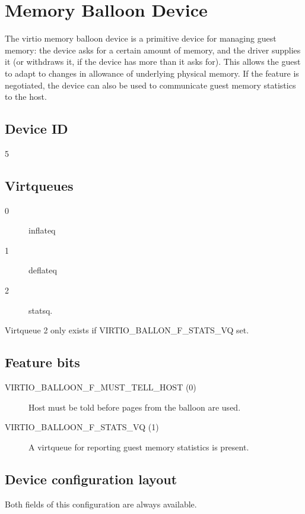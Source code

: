 \section{Memory Balloon Device}\label{sec:Device Types / Memory Balloon Device}

The virtio memory balloon device is a primitive device for
managing guest memory: the device asks for a certain amount of
memory, and the driver supplies it (or withdraws it, if the device
has more than it asks for). This allows the guest to adapt to
changes in allowance of underlying physical memory. If the
feature is negotiated, the device can also be used to communicate
guest memory statistics to the host.

\subsection{Device ID}\label{sec:Device Types / Memory Balloon Device / Device ID}
  5

\subsection{Virtqueues}\label{sec:Device Types / Memory Balloon Device / Virtqueues}
\begin{description}
\item[0] inflateq
\item[1] deflateq
\item[2] statsq.
\end{description}

  Virtqueue 2 only exists if VIRTIO_BALLON_F_STATS_VQ set.

\subsection{Feature bits}\label{sec:Device Types / Memory Balloon Device / Feature bits}
\begin{description}
\item[VIRTIO_BALLOON_F_MUST_TELL_HOST (0)] Host must be told before
    pages from the balloon are used.

\item[VIRTIO_BALLOON_F_STATS_VQ (1)] A virtqueue for reporting guest
    memory statistics is present.
\end{description}

\subsection{Device configuration layout}\label{sec:Device Types / Memory Balloon Device / Device configuration layout}
  Both fields of this configuration
  are always available.

